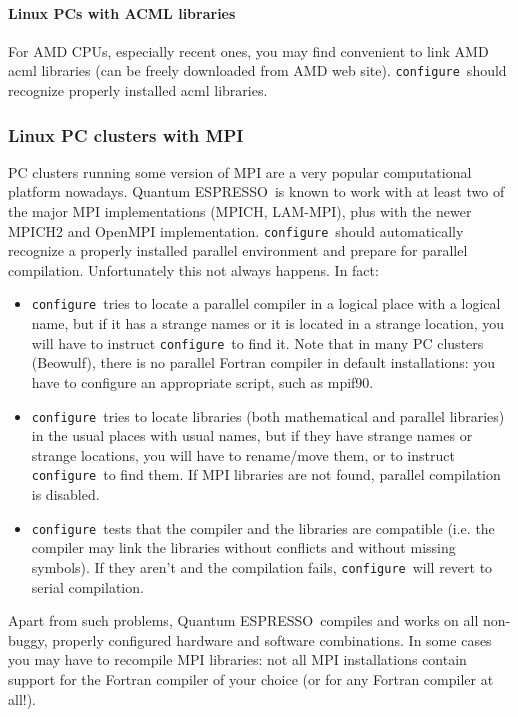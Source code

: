 \documentclass[12pt,a4paper]{article}
\def\qe{{\sc Quantum ESPRESSO}}
\def\configure{\texttt{configure}}
\begin{document}
\paragraph{Linux PCs with ACML libraries}
For AMD CPUs, especially recent ones, you may find convenient to
link AMD acml libraries (can be freely downloaded from AMD web site).
\configure\ should recognize properly installed acml libraries.

\subsubsection{Linux PC clusters with MPI}
\label{SubSec:LinuxPCMPI}
PC clusters running some version of MPI are a very popular
computational platform nowadays. \qe\ is known to work
with at least two of the major MPI implementations (MPICH, LAM-MPI),
plus with the newer MPICH2 and OpenMPI implementation.
\configure\ should automatically recognize a properly installed
parallel environment and prepare for parallel compilation.
Unfortunately this not always happens. In fact:
\begin{itemize}
\item \configure\ tries to locate a parallel compiler in a logical
  place with a logical name,  but if it has a strange names or it is
  located  in a strange location, you will have to instruct \configure\
  to find it. Note that in many PC clusters (Beowulf), there is no
  parallel Fortran compiler in default installations:  you have to
  configure an appropriate script, such as mpif90.
\item \configure\ tries to locate libraries (both mathematical and
  parallel libraries) in the usual places with usual names, but if
  they have strange names or strange locations, you will have to
  rename/move them, or to instruct \configure\ to find them. If MPI
  libraries are not found,
  parallel compilation is disabled.
\item \configure\ tests that the compiler and the libraries are
  compatible (i.e. the compiler may link the libraries without
  conflicts and without missing symbols). If they aren't and the
  compilation fails, \configure\ will revert to serial compilation.
\end{itemize}

Apart from such problems, \qe\ compiles and works on all non-buggy, properly
configured hardware and software combinations. In some cases you may have to
recompile MPI libraries: not all MPI installations contain support for
the Fortran compiler of your choice (or for any Fortran compiler
at all!).
\end{document}

